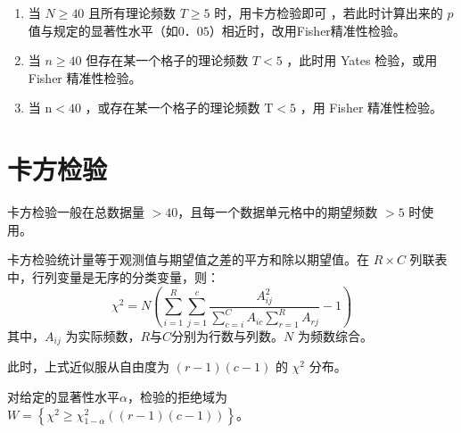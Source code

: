 \begin{enumerate}
    \item 当 $N \geq 40$ 且所有理论频数 $T \geq 5$ 时，用卡方检验即可 ，若此时计算出来的 $p$ 值与规定的显著性水平（如$0．05$）相近时，改用Fisher精准性检验。
    \item 当 $n \geq 40$ 但存在某一个格子的理论频数 $T<5$ ，此时用 Yates 检验，或用 Fisher 精准性检验。
    \item 当 $\mathrm{n}<40$ ，或存在某一个格子的理论频数 $\mathrm{T}<5$ ，用 Fisher 精准性检验。
\end{enumerate}

\section{卡方检验}

\begin{definition}[卡方检验]
    \begin{tips}
        卡方检验一般在总数据量 $> 40$，且每一个数据单元格中的期望频数 $> 5$ 时使用。
    \end{tips}
    卡方检验统计量等于观测值与期望值之差的平方和除以期望值。在 $R \times C$ 列联表中，行列变量是无序的分类变量，则：
    $$
        \chi^2=N\left(\sum_{i=1}^R \sum_{j=1}^c \frac{A_{i j}^2}{\sum_{c=i}^C A_{i c} \sum_{r=1}^R A_{r j}}-1\right)
    $$
    其中，$A_{i j}$ 为实际频数，$R$与$C$分别为行数与列数。$N$ 为频数综合。

    此时，上式近似服从自由度为 $(r-1)(c-1)$ 的 $\chi^2$ 分布。

    对给定的显著性水平$\alpha$，检验的拒绝域为$W=\left\{\chi^2 \geqslant \chi_{1-\alpha}^2((r-1)(c-1))\right\}$。
\end{definition}




